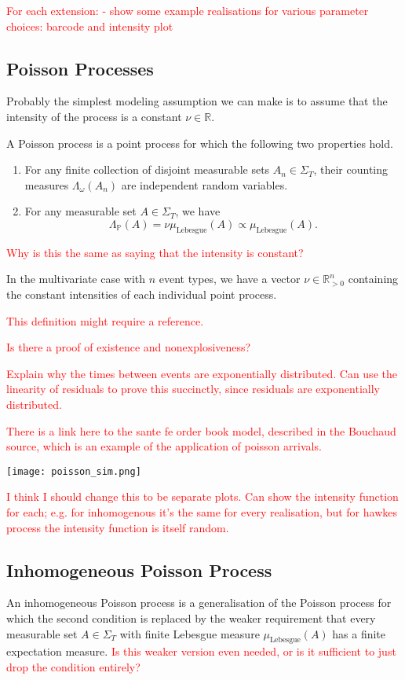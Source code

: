 \documentclass[honours,12pt]{unswthesis}
\numberwithin{equation}{section}
\begin{document}
\textcolor{red}{
For each extension:
- show some example realisations for various parameter choices: barcode and intensity plot
}


\subsection{Poisson Processes}
Probably the simplest modeling assumption we can make is to assume that the intensity of the process is a constant $\nu\in\mathbb{R}$.

A Poisson process is a point process for which the following two properties hold.
\begin{enumerate}
	\item For any finite collection of disjoint measurable sets $A_n\in\Sigma_T$, their counting measures $\Lambda_\omega(A_n)$ are independent random variables.
	\item For any measurable set $A\in\Sigma_T$, we have $$\Lambda_{\mathbb P}(A) = \nu \mu_{\mathrm{Lebesgue}}(A)\propto\mu_{\mathrm{Lebesgue}}(A).$$
\end{enumerate}
\textcolor{red}{Why is this the same as saying that the intensity is constant?}

In the multivariate case with $n$ event types, we have a vector $\nu\in\mathbb{R}_{>0}^n$ containing the constant intensities of each individual point process.

\textcolor{red}{This definition might require a reference.}

\textcolor{red}{Is there a proof of existence and nonexplosiveness?}

\textcolor{red}{Explain why the times between events are exponentially distributed. Can use the linearity of residuals to prove this succinctly, since residuals are exponentially distributed.}

\textcolor{red}{There is a link here to the sante fe order book model, described in the Bouchaud source, which is an example of the application of poisson arrivals.}

\texttt{[image: poisson\_sim.png]}

\textcolor{red}{I think I should change this to be separate plots. Can show the intensity function for each; e.g. for inhomogenous it's the same for every realisation, but for hawkes process the intensity function is itself random.}

\subsection{Inhomogeneous Poisson Process}
An inhomogeneous Poisson process is a generalisation of the Poisson process for which the second condition is replaced by the weaker requirement that every measurable set $A\in\Sigma_T$ with finite Lebesgue measure $\mu_{\mathrm{Lebesgue}}(A)$ has a finite expectation measure. \textcolor{red}{Is this weaker version even needed, or is it sufficient to just drop the condition entirely?}
\end{document}
